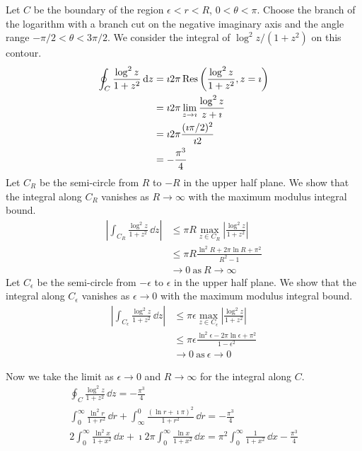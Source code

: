 {\begin{Solution}
  \label{solution int (ln x)^2 / (1 + x^2)}
  Let $C$ be the boundary of the region $\epsilon < r < R$, $0 < \theta < \pi$.  Choose the 
  branch of the logarithm with a branch cut on the negative imaginary axis
  and the angle range $-\pi / 2 < \theta < 3 \pi / 2$.  We consider the integral of
  $\log^2 z / (1 + z^2)$ on this contour.
  \begin{align*}
    \oint_C \frac{\log^2 z}{1 + z^2}\,\mathrm{d} z
    &= \imath 2 \pi \mathop{\mathrm{Res}}\nolimits \left( \frac{\log^2 z}{1 + z^2}, z = \imath \right) 
    \\
    &= \imath 2 \pi \lim_{z \to \imath} \frac{\log^2 z}{z + \imath} 
    \\
    &= \imath 2 \pi \frac{(\imath \pi / 2)^2}{\imath 2}
    \\
    &= - \frac{\pi^3}{4}
  \end{align*}
  Let $C_R$ be the semi-circle from $R$ to $-R$ in the upper half plane.
  We show that the integral along $C_R$ vanishes as $R \to \infty$ with the maximum
  modulus integral bound.
  \begin{align*}
    \left| \int_{C_R} \frac{\log^2 z}{1 + z^2}\,\dd z \right|
    &\leq \pi R \max_{z \in C_R} \left| \frac{\log^2 z}{1 + z^2} \right|
    \\
    &\leq \pi R \frac{\ln^2 R + 2 \pi \ln R + \pi^2}{R^2 - 1} 
    \\
    &\to 0\ \mathrm{as}\ R \to \infty 
  \end{align*}
  Let $C_\epsilon$ be the semi-circle from $-\epsilon$ to $\epsilon$ in the upper half plane.
  We show that the integral along $C_\epsilon$ vanishes as $\epsilon \to 0$ with the maximum
  modulus integral bound.
  \begin{align*}
    \left| \int_{C_\epsilon} \frac{\log^2 z}{1 + z^2}\,\dd z \right|
    &\leq \pi \epsilon \max_{z \in C_\epsilon} \left| \frac{\log^2 z}{1 + z^2} \right|
    \\
    &\leq \pi \epsilon \frac{\ln^2 \epsilon - 2 \pi \ln \epsilon + \pi^2}{1 - \epsilon^2}
    \\
    &\to 0\ \mathrm{as}\ \epsilon \to 0
  \end{align*}

  Now we take the limit as $\epsilon \to 0$ and $R \to \infty$ for the integral along $C$.
  \begin{gather}
    \nonumber
    \oint_C \frac{\log^2 z}{1 + z^2}\,\dd z = - \frac{\pi^3}{4} 
    \\
    \nonumber
    \int_0^\infty \frac{\ln^2 r}{1 + r^2}\,\dd r 
    + \int_\infty^0 \frac{(\ln r + \imath \pi)^2}{1 + r^2}\,\dd r 
    = - \frac{\pi^3}{4} 
    \\
    \label{equation int (ln x)^2 / (1 + x^2)}
    2 \int_0^\infty \frac{\ln^2 x}{1 + x^2}\,\dd x 
    + \imath 2 \pi \int_0^\infty \frac{\ln x}{1 + x^2}\,\dd x 
    = \pi^2 \int_0^\infty \frac{1}{1 + x^2}\,\dd x 
    - \frac{\pi^3}{4}
  \end{gather}


\end{Solution}}
